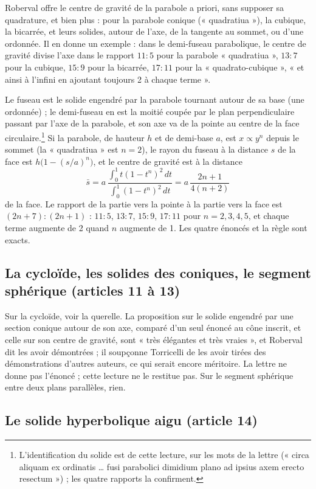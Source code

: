 \documentclass[11pt,a4paper]{article}
\begin{document}
Roberval offre le centre de gravité de la parabole a priori, sans supposer sa
quadrature, et bien plus : pour la parabole conique (« quadratiua »), la cubique,
la bicarrée, et leurs solides, autour de l'axe, de la tangente au sommet, ou
d'une ordonnée. Il en donne un exemple : dans le demi-fuseau parabolique, le
centre de gravité divise l'axe dans le rapport $11:5$ pour la parabole
« quadratiua », $13:7$ pour la cubique, $15:9$ pour la bicarrée, $17:11$ pour la
« quadrato-cubique », « et ainsi à l'infini en ajoutant toujours 2 à chaque
terme ».

Le fuseau est le solide engendré par la parabole tournant autour de sa base (une
ordonnée) ; le demi-fuseau en est la moitié coupée par le plan perpendiculaire
passant par l'axe de la parabole, et son axe va de la pointe au centre de la face
circulaire.\footnote{L'identification du solide est de cette lecture, sur les
mots de la lettre (« circa aliquam ex ordinatis \ldots{} fusi parabolici dimidium
plano ad ipsius axem erecto resectum ») ; les quatre rapports la confirment.} Si
la parabole, de hauteur $h$ et de demi-base $a$, est $x\propto y^n$ depuis le
sommet (la « quadratiua » est $n=2$), le rayon du fuseau à la distance $s$ de la
face est $h\bigl(1-(s/a)^n\bigr)$, et le centre de gravité est à la distance
\[
\bar s = a\,\frac{\int_0^1 t(1-t^n)^2\,dt}{\int_0^1 (1-t^n)^2\,dt} = a\,\frac{2n+1}{4(n+2)}
\]
de la face. Le rapport de la partie vers la pointe à la partie vers la face est
$(2n+7):(2n+1)$ : $11:5$, $13:7$, $15:9$, $17:11$ pour $n=2,3,4,5$, et chaque
terme augmente de 2 quand $n$ augmente de 1. Les quatre énoncés et la règle
sont exacts.

\subsection*{La cycloïde, les solides des coniques, le segment sphérique (articles 11 à 13)}

Sur la cycloïde, voir la querelle. La proposition sur le solide engendré par une
section conique autour de son axe, comparé d'un seul énoncé au cône inscrit, et
celle sur son centre de gravité, sont « très élégantes et très vraies », et
Roberval dit les avoir démontrées ; il soupçonne Torricelli de les avoir tirées
des démonstrations d'autres auteurs, ce qui serait encore méritoire. La lettre
ne donne pas l'énoncé ; cette lecture ne le restitue pas. Sur le segment
sphérique entre deux plans parallèles, rien.

\subsection*{Le solide hyperbolique aigu (article 14)}
\end{document}
